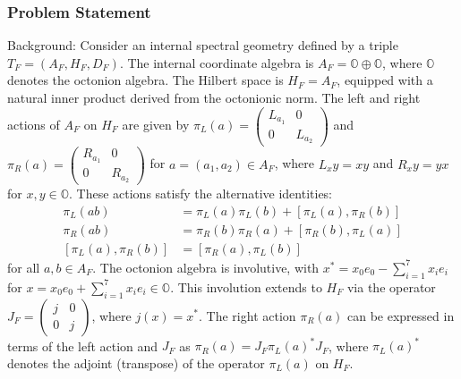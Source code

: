 \documentclass[10pt]{article}
\begin{document}
\subsubsection*{Problem Statement}
Background:
Consider an internal spectral geometry defined by a triple $T_F = (A_F, H_F, D_F)$. The internal coordinate algebra is $A_F = \mathbb{O}\oplus \mathbb{O}$, where $\mathbb{O}$ denotes the octonion algebra. The Hilbert space is $H_F = A_F$, equipped with a natural inner product derived from the octonionic norm. The left and right actions of $A_F$ on $H_F$ are given by $\pi_L(a) = \begin{pmatrix} L_{a_1} & 0 \\ 0 & L_{a_2} \end{pmatrix}$ and $\pi_R(a) = \begin{pmatrix} R_{a_1} & 0 \\ 0 & R_{a_2} \end{pmatrix}$ for $a=(a_1,a_2)\in A_F$, where $L_x y = xy$ and $R_x y = yx$ for $x,y\in\mathbb{O}$. These actions satisfy the alternative identities:
\begin{align*}
\pi_L(ab)&=\pi_L(a)\pi_L(b) +[\pi_L(a),\pi_R(b)] \\
\pi_R(ab)&=\pi_R(b)\pi_R(a)+[\pi_R(b),\pi_L(a)] \\
[\pi_L(a),\pi_R(b)]&=[\pi_R(a),\pi_L(b)]
\end{align*}
for all $a,b\in A_F$. The octonion algebra is involutive, with $x^* = x_0 e_0 - \sum_{i=1}^7 x_i e_i$ for $x = x_0 e_0 + \sum_{i=1}^7 x_i e_i \in \mathbb{O}$. This involution extends to $H_F$ via the operator $J_F = \begin{pmatrix} j & 0 \\ 0 & j \end{pmatrix}$, where $j(x) = x^*$. The right action $\pi_R(a)$ can be expressed in terms of the left action and $J_F$ as $\pi_R(a) = J_F\pi_L(a)^*J_F$, where $\pi_L(a)^*$ denotes the adjoint (transpose) of the operator $\pi_L(a)$ on $H_F$.
\end{document}
